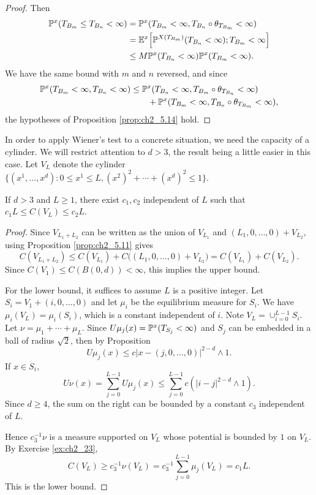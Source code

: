 \begin{proof}
Then
\begin{align*}
    \P^x(T_{B_m} \leq T_{B_n} < \infty) &= \P^x(T_{B_m} < \infty, T_{B_n} \circ \theta_{T_{B_m}} < \infty) \\
    &= \E^x\Big[\P^{X(T_{B_m})}(T_{B_n} < \infty); T_{B_m} < \infty\Big] \\
    &\leq M\P^x(T_{B_n} < \infty)\P^x(T_{B_m} < \infty).
\end{align*}
We have the same bound with $m$ and $n$ reversed, and since
\begin{align*}
    \P^x(T_{B_m} < \infty, T_{B_n} < \infty) &\leq \P^x(T_{B_n} < \infty, T_{B_m} \circ \theta_{T_{B_n}} < \infty) \\
    &\qquad+ \P^x(T_{B_m} < \infty, T_{B_n} \circ \theta_{T_{B_m}} < \infty),
\end{align*}
the hypotheses of Proposition \ref{prop:ch2_5.14} hold.
\end{proof}

In order to apply Wiener's test to a concrete situation, we need the capacity of a cylinder. We will restrict attention to $d > 3$, the result being a little easier in this case. Let $V_L$ denote the cylinder $\{(x^1,\ldots,x^d) : 0 \leq x^1 \leq L, (x^2)^2 + \cdots + (x^d)^2 \leq 1\}$.

\begin{proposition}\label{prop:ch2_5.16}
If $d > 3$ and $L \geq 1$, there exist $c_1,c_2$ independent of $L$ such that $c_1L \leq C(V_L) \leq c_2L$.
\end{proposition}

\begin{proof}
Since $V_{L_1+L_2}$ can be written as the union of $V_{L_1}$ and $(L_1,0,\ldots,0) + V_{L_2}$, using Proposition \ref{prop:ch2_5.11} gives
\[
    C(V_{L_1+L_2}) \leq C(V_{L_1}) + C\big((L_1,0,\ldots,0) + V_{L_2}\big) = C(V_{L_1}) + C(V_{L_2}).
\]
Since $C(V_1) \leq C(B(0,d)) < \infty$, this implies the upper bound.

For the lower bound, it suffices to assume $L$ is a positive integer. Let $S_i = V_1+(i,0,\ldots,0)$ and let $\mu_i$ be the equilibrium measure for $S_i$. We have $\mu_i(V_L) = \mu_i(S_i)$, which is a constant independent of $i$. Note $V_L = \cup_{i=0}^{L-1}S_i$. Let $\nu = \mu_1 + \cdots + \mu_L$. Since $U\mu_j(x) = \P^x(T_{S_j} < \infty)$ and $S_j$ can be embedded in a ball of radius $\sqrt{2}$, then by Proposition 
\mpagebreak
\[
    U\mu_j(x) \leq c|x-(j,0,\ldots,0)|^{2-d} \wedge 1.
\]
If $x \in S_i$,
\[
    U\nu(x) = \sum_{j=0}^{L-1} U\mu_j(x) \leq \sum_{j=0}^{L-1} c(|i-j|^{2-d} \wedge 1).
\]
Since $d \geq 4$, the sum on the right can be bounded by a constant $c_3$ independent of $L$.

Hence $c_3^{-1}\nu$ is a measure supported on $V_L$ whose potential is bounded
by $1$ on $V_L$. By Exercise \ref{ex:ch2_23},
\[
    C(V_L) \geq c_3^{-1}\nu(V_L) = c_3^{-1}\sum_{j=0}^{L-1} \mu_j(V_L) = c_1L.
\]
This is the lower bound.
\end{proof}

